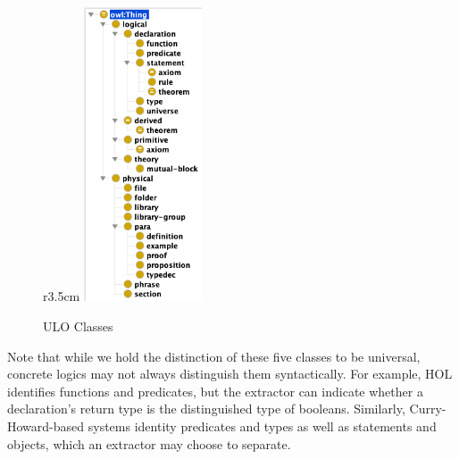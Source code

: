 \begin{figure}r{3.5cm}\vspace*{-2.5em}
  \includegraphics[width=3.5cm]{classes}\vspace*{-.5em}
  \caption{ULO Classes}\label{fig:classes}\vspace*{-3em}
\end{figure}
Note that while we hold the distinction of these five classes to be universal, concrete logics may not always distinguish them syntactically.
For example, HOL identifies functions and predicates, but the extractor can indicate whether a declaration's return type is the distinguished type of booleans.
Similarly, Curry-Howard-based systems identity predicates and types as well as statements and objects, which an extractor may choose to separate.




